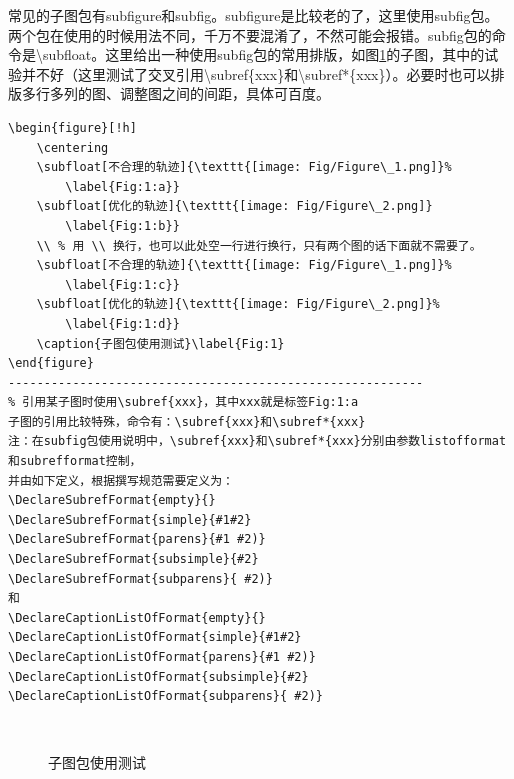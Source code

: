 常见的子图包有subfigure和subfig。subfigure是比较老的了，这里使用subfig包。两个包在使用的时候用法不同，千万不要混淆了，不然可能会报错。subfig包的命令是\textbackslash{}subfloat。这里给出一种使用subfig包的常用排版，如图\ref{Fig:1}的子图，其中的试验并不好（这里测试了交叉引用\textbackslash{}subref\{xxx\}和\textbackslash{}subref*\{xxx\}）。必要时也可以排版多行多列的图、调整图之间的间距，具体可百度。

\begin{lstlisting}
\begin{figure}[!h]
	\centering
	\subfloat[不合理的轨迹]{\texttt{[image: Fig/Figure\_1.png]}%
		\label{Fig:1:a}}
	\subfloat[优化的轨迹]{\texttt{[image: Fig/Figure\_2.png]}
		\label{Fig:1:b}}
	\\ % 用 \\ 换行，也可以此处空一行进行换行，只有两个图的话下面就不需要了。
	\subfloat[不合理的轨迹]{\texttt{[image: Fig/Figure\_1.png]}%
		\label{Fig:1:c}}
	\subfloat[优化的轨迹]{\texttt{[image: Fig/Figure\_2.png]}%
		\label{Fig:1:d}}
	\caption{子图包使用测试}\label{Fig:1}
\end{figure}
----------------------------------------------------------
% 引用某子图时使用\subref{xxx}，其中xxx就是标签Fig:1:a
子图的引用比较特殊，命令有：\subref{xxx}和\subref*{xxx}
注：在subfig包使用说明中，\subref{xxx}和\subref*{xxx}分别由参数listofformat和subrefformat控制，
并由如下定义，根据撰写规范需要定义为：
\DeclareSubrefFormat{empty}{}
\DeclareSubrefFormat{simple}{#1#2}
\DeclareSubrefFormat{parens}{#1 #2)}
\DeclareSubrefFormat{subsimple}{#2}
\DeclareSubrefFormat{subparens}{ #2)}
和
\DeclareCaptionListOfFormat{empty}{}
\DeclareCaptionListOfFormat{simple}{#1#2}
\DeclareCaptionListOfFormat{parens}{#1 #2)}
\DeclareCaptionListOfFormat{subsimple}{#2}
\DeclareCaptionListOfFormat{subparens}{ #2)}
\end{lstlisting}
\begin{figure}[!h]
	\centering
	\\ %
	\caption{子图包使用测试}\label{Fig:1}
\end{figure}





